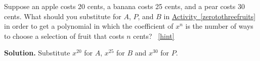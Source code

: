 \documentclass{book}
\begin{document}
\setcounter{project}{242}
\addtocounter{project}{-1}
\begin{activity}[]\label{activity-235}
\hypertarget{p-1338}{}%
Suppose an apple costs 20 cents, a banana costs 25 cents, and a pear costs 30 cents. What should you substitute for \(A\), \(P\), and \(B\) in \hyperref[zerotothreefruits]{Activity~\ref{zerotothreefruits}} in order to get a polynomial in which the coefficient of \(x^n\) is the number of ways to choose a selection of fruit that costs \(n\) cents?%
~\hfill{\tiny\hyperlink{a-242}{[hint]}\hypertarget{q-242}{}}\par\smallskip%
\noindent\textbf{Solution.}\hypertarget{solution-177}{}\quad%
\hypertarget{p-1340}{}%
Substitute \(x^{20}\) for \(A\), \(x^{25}\) for \(B\) and \(x^{30}\) for \(P\).%
\end{activity}
\end{document}
